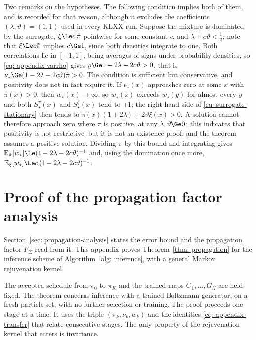 \documentclass{article}
\begin{document}
\begin{remark}
\label{rem: appendix-domination}
Two remarks on the hypotheses. The following condition implies both of them, and is recorded for that reason, although it excludes the coefficients $(\lambda,\vartheta)=(1,1)$ used in every KLXX run. Suppose the mixture is dominated by the surrogate, $\xi\Le c\,\tilde\pi$ pointwise for some constant $c$, and $\lambda+c\vartheta<\tfrac12$; note that $\xi\Le c\tilde\pi$ implies $c\Ge1$, since both densities integrate to one. Both correlations lie in $[-1,1]$, being averages of signs under probability densities, so \eqref{eq: appendix-varrho} gives $\varrho\Ge1-2\lambda-2c\vartheta>0$, that is $\nu_\star\Ge(1-2\lambda-2c\vartheta)\tilde\pi>0$. The condition is sufficient but conservative, and positivity does not in fact require it. If $\nu_\star(x)$ approaches zero at some $x$ with $\pi(x)>0$, then $w_\star(x)\to\infty$, so $w_\star(x)$ exceeds $w_\star(y)$ for almost every $y$ and both $S^{\tilde\pi}_\star(x)$ and $S^{\xi}_\star(x)$ tend to $+1$; the right-hand side of \eqref{eq: surrogate-stationary} then tends to $\tilde\pi(x)(1+2\lambda)+2\vartheta\xi(x)>0$. A solution cannot therefore approach zero where $\pi$ is positive, at any $\lambda,\vartheta\Ge0$; this indicates that positivity is not restrictive, but it is not an existence proof, and the theorem assumes a positive solution. Dividing $\pi$ by this bound and integrating gives $\mathbb E_{\tilde\pi}[w_\star]\Le(1-2\lambda-2c\vartheta)^{-1}$ and, using the domination once more, $\mathbb E_{\xi}[w_\star]\Le c\,(1-2\lambda-2c\vartheta)^{-1}$.
\end{remark}


\section{Proof of the propagation factor analysis}
\label{sec: appendix-propagation}

Section~\ref{sec: propagation-analysis} states the error bound and the propagation factor $F_\Sigma$ read from it. This appendix proves Theorem~\ref{thm: propagation} for the inference scheme of Algorithm~\ref{alg: inference}, with a general Markov rejuvenation kernel.

The accepted schedule from $\pi_0$ to $\pi_K$ and the trained maps $G_1,\dots,G_K$ are held fixed. The theorem concerns inference with a trained Boltzmann generator, on a fresh particle set, with no further selection or training. The proof proceeds one stage at a time. It uses the triple $(\pi_k,\nu_k,w_k)$ and the identities \eqref{eq: appendix-transfer} that relate consecutive stages. The only property of the rejuvenation kernel that enters is invariance.
\end{document}
